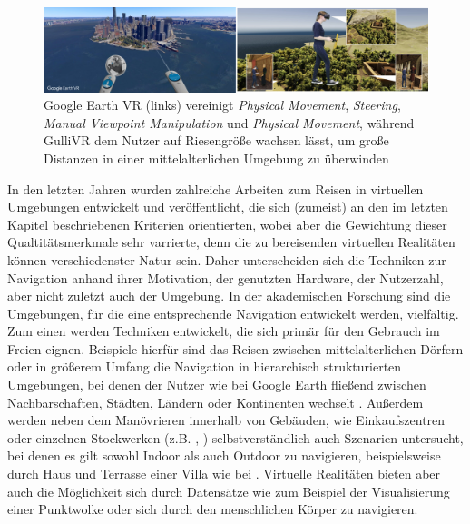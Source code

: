 \begin{figure}[h!]
  \centering
  \includegraphics[width=\textwidth]{images/google_gulli.jpg}
  \caption{Google Earth VR (links) vereinigt \textit{Physical Movement}, \textit{Steering}, \textit{Manual Viewpoint Manipulation} und \textit{Physical Movement}, während GulliVR\cite{Krekhov2018GulliVR} dem Nutzer auf Riesengröße wachsen lässt, um große Distanzen  in einer mittelalterlichen Umgebung zu überwinden}
  \label{fig:todo}
\end{figure}

In den letzten Jahren wurden zahlreiche Arbeiten zum Reisen in virtuellen Umgebungen entwickelt und veröffentlicht, die sich (zumeist) an den im letzten Kapitel beschriebenen Kriterien orientierten, wobei aber die Gewichtung dieser Qualtitätsmerkmale sehr varrierte, denn die zu bereisenden virtuellen Realitäten können verschiedenster Natur sein. Daher unterscheiden sich die Techniken zur Navigation anhand ihrer Motivation, der genutzten Hardware, der Nutzerzahl, aber nicht zuletzt auch der Umgebung.
In der akademischen Forschung sind die Umgebungen, für die eine entsprechende Navigation entwickelt werden, vielfältig.
Zum einen werden Techniken entwickelt, die sich primär für den Gebrauch im Freien eignen. Beispiele hierfür sind das Reisen zwischen mittelalterlichen Dörfern \cite{Krekhov2018GulliVR} oder in größerem Umfang die Navigation in hierarchisch strukturierten Umgebungen, bei denen der Nutzer wie bei Google Earth fließend zwischen Nachbarschaften, Städten, Ländern oder Kontinenten wechselt \cite{pierce_representations}.
Außerdem werden neben dem Manövrieren innerhalb von Gebäuden, wie Einkaufszentren oder einzelnen Stockwerken (z.B. \cite{Richardson1999SpatialEnvironments}, \cite{Liang2018EvaluatingEnvironments}) selbstverständlich auch Szenarien untersucht, bei denen es gilt sowohl Indoor als auch Outdoor zu navigieren, beispielsweise durch Haus und Terrasse einer Villa wie bei \cite{Dallat2018Giant}. 
Virtuelle Realitäten bieten aber auch die Möglichkeit sich durch Datensätze wie zum Beispiel der Visualisierung einer Punktwolke oder sich durch den menschlichen Körper \cite{Kopper2006DesignEnvironments} zu navigieren.


